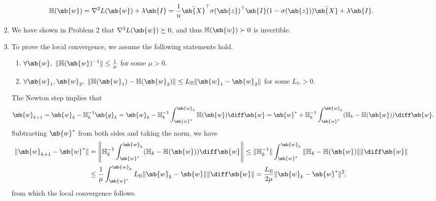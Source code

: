 \begin{exercise}
\begin{enumerate}
\begin{solution}
\begin{enumerate}
\begin{gather*}
                            \mathbb{H}(\mb{w}) = \nabla^2 L(\mb{w}) + \lambda \mb{I} = \frac{1}{n} \bar{\mb{X}}^\top \sigma(\mb{z})^\top \mb{I} (1-\sigma(\mb{z})) \bar{\mb{X}} + \lambda \mb{I}.
                        \end{gather*}
                    \item We have shown in Problem 2 that $\nabla^2 L(\mb{w}) \succeq 0$, and thus $\mathbb{H}(\mb{w}) \succ 0$ is invertible.
                    \item To prove the local convergence, we assume the following statements hold.
                        \begin{enumerate}
                            \item $\forall \mb{w}, \ \|\mathbb{H}(\mb{w})^{-1}\| \leq \frac{1}{\mu}$ for some $\mu > 0$.
                            \item $\forall \mb{w}_1, \mb{w}_2,\ \|\mathbb{H}(\mb{w}_1) - \mathbb{H}(\mb{w}_2)\| \leq L_{\mathbb{H}} \|\mb{w}_1 - \mb{w}_2\|$ for some $L_{\mathbb{H}} > 0$.
                        \end{enumerate}
                        The Newton step implies that
                        \begin{align*}
                            \mb{w}_{k+1} = \mb{w}_k - \mathbb{H}_k^{-1} \mb{g}_k = \mb{w}_k - \mathbb{H}_k^{-1} \int_{\mb{w}^*}^{\mb{w}_k} \mathbb{H}(\mb{w}) \diff \mb{w} = \mb{w}^* + \mathbb{H}_k^{-1} \int_{\mb{w}^*}^{\mb{w}_k} (\mathbb{H}_k- \mathbb{H}(\mb{w})) \diff \mb{w}.
                        \end{align*}
                        Subtracting $\mb{w}^*$ from both sides and taking the norm, we have
                        \begin{align*}
                            \|\mb{w}_{k+1} - \mb{w}^*\| & = \left\|\mathbb{H}_k^{-1} \int_{\mb{w}^*}^{\mb{w}_k} (\mathbb{H}_k- \mathbb{H}(\mb{w})) \diff \mb{w} \right\| \le \|\mathbb{H}_k^{-1}\| \int_{\mb{w}^*}^{\mb{w}_k} \|\mathbb{H}_k- \mathbb{H}(\mb{w})\| \|\diff \mb{w}\| \\
                                                        & \le \frac{1}{\mu} \int_{\mb{w}^*}^{\mb{w}_k} L_{\mathbb{H}} \|\mb{w}_k - \mb{w}\| \|\diff \mb{w}\| = \frac{L_{\mathbb{H}}}{2\mu} \|\mb{w}_k - \mb{w}^*\|^2,
                        \end{align*} from which the local convergence follows.


\end{enumerate}
\end{solution}
\end{enumerate}
\end{exercise}
